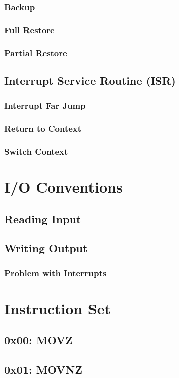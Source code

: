 \documentclass[oneside, a4paper]{memoir}
\begin{document}
\subsection{Backup}
\subsection{Full Restore}
\subsection{Partial Restore}
\section{Interrupt Service Routine (ISR)}
\subsection{Interrupt Far Jump}
\subsection{Return to Context}
\subsection{Switch Context}

\chapter{I/O Conventions}
\section{Reading Input}
\section{Writing Output}
\subsection{Problem with Interrupts}

\chapter{Instruction Set}
\section*{0x00: MOVZ}
\section*{0x01: MOVNZ}
\end{document}
